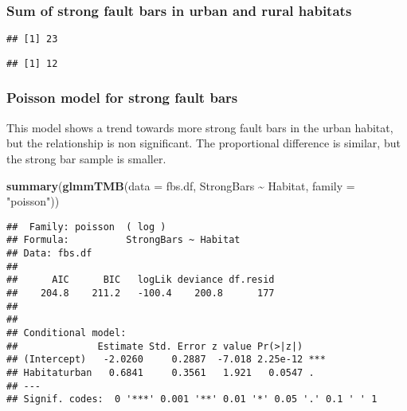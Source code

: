 \documentclass[
]{article}
\newenvironment{Shaded}{\begin{snugshade}}{\end{snugshade}}
\newcommand{\AttributeTok}[1]{\textcolor[rgb]{0.13,0.29,0.53}{#1}}
\newcommand{\FunctionTok}[1]{\textcolor[rgb]{0.13,0.29,0.53}{\textbf{#1}}}
\newcommand{\NormalTok}[1]{#1}
\newcommand{\SpecialCharTok}[1]{\textcolor[rgb]{0.81,0.36,0.00}{\textbf{#1}}}
\newcommand{\StringTok}[1]{\textcolor[rgb]{0.31,0.60,0.02}{#1}}
\begin{document}
\subsubsection{Sum of strong fault bars in urban and rural
habitats}\label{sum-of-strong-fault-bars-in-urban-and-rural-habitats}

\begin{Shaded}
\end{Shaded}

\begin{verbatim}
## [1] 23
\end{verbatim}

\begin{Shaded}
\end{Shaded}

\begin{verbatim}
## [1] 12
\end{verbatim}

\subsubsection{Poisson model for strong fault
bars}\label{poisson-model-for-strong-fault-bars}

This model shows a trend towards more strong fault bars in the urban
habitat, but the relationship is non significant. The proportional
difference is similar, but the strong bar sample is smaller.

\begin{Shaded}
\begin{Highlighting}[]
\FunctionTok{summary}\NormalTok{(}\FunctionTok{glmmTMB}\NormalTok{(}\AttributeTok{data =}\NormalTok{ fbs.df, StrongBars }\SpecialCharTok{\textasciitilde{}}\NormalTok{ Habitat, }\AttributeTok{family =} \StringTok{"poisson"}\NormalTok{))}
\end{Highlighting}
\end{Shaded}

\begin{verbatim}
##  Family: poisson  ( log )
## Formula:          StrongBars ~ Habitat
## Data: fbs.df
## 
##      AIC      BIC   logLik deviance df.resid 
##    204.8    211.2   -100.4    200.8      177 
## 
## 
## Conditional model:
##              Estimate Std. Error z value Pr(>|z|)    
## (Intercept)   -2.0260     0.2887  -7.018 2.25e-12 ***
## Habitaturban   0.6841     0.3561   1.921   0.0547 .  
## ---
## Signif. codes:  0 '***' 0.001 '**' 0.01 '*' 0.05 '.' 0.1 ' ' 1
\end{verbatim}
\end{document}
